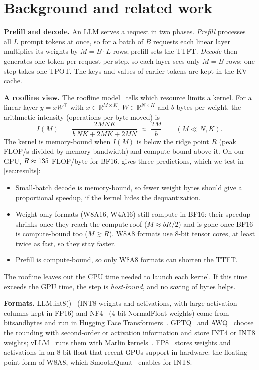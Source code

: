 \section{Background and related work}
\label{sec:background}

\textbf{Prefill and decode.} An LLM serves a request in two phases. \emph{Prefill} processes all $L$
prompt tokens at once, so for a batch of $B$ requests each linear layer multiplies its weights by
$M=B\cdot L$ rows; prefill sets the TTFT. \emph{Decode} then generates one token per request per step,
so each layer sees only $M=B$ rows; one step takes one TPOT. The keys and values of earlier tokens
are kept in the KV cache.

\textbf{A roofline view.} The roofline model~\cite{williams2009roofline} tells which resource limits a
kernel. For a linear layer $y=xW^\top$ with $x\in\mathbb{R}^{M\times K}$, $W\in\mathbb{R}^{N\times K}$
and $b$ bytes per weight, the arithmetic intensity (operations per byte moved) is
\begin{equation}
  I(M) \;=\; \frac{2MNK}{b\,NK + 2MK + 2MN} \;\approx\; \frac{2M}{b} \qquad (M \ll N, K).
  \label{eq:intensity}
\end{equation}
The kernel is memory-bound when $I(M)$ is below the ridge point $R$ (peak FLOP/s divided by memory
bandwidth) and compute-bound above it. On our GPU, $R\approx135$ FLOP/byte for BF16.
 gives three predictions, which we test in \cref{sec:results}:
\begin{itemize}
\item[\textbf{P1}] Small-batch decode is memory-bound, so fewer weight bytes should give a
  proportional speedup, if the kernel hides the dequantization.
\item[\textbf{P2}] Weight-only formats (W8A16, W4A16) still compute in BF16: their speedup shrinks
  once they reach the compute roof ($M\approx bR/2$) and is gone once BF16 is compute-bound too
  ($M\gtrsim R$). W8A8 formats use 8-bit tensor cores, at least twice as fast, so they stay faster.
\item[\textbf{P3}] Prefill is compute-bound, so only W8A8 formats can shorten the TTFT.
\end{itemize}
The roofline leaves out the CPU time needed to launch each kernel. If this time exceeds the GPU time,
the step is \emph{host-bound}, and no saving of bytes helps.

\textbf{Formats.} LLM.int8()~\cite{dettmers2022llmint8} (INT8 weights and activations, with large
activation columns kept in FP16) and NF4~\cite{dettmers2023qlora} (4-bit NormalFloat weights) come
from bitsandbytes and run in Hugging Face Transformers~\cite{hfbnb}. GPTQ~\cite{frantar2023gptq} and
AWQ~\cite{lin2024awq} choose the rounding with second-order or activation information and store INT4
or INT8 weights; vLLM~\cite{kwon2023vllm} runs them with Marlin kernels~\cite{frantar2025marlin}.
FP8~\cite{micikevicius2022fp8} stores weights and activations in an 8-bit float that recent GPUs
support in hardware: the floating-point form of W8A8, which SmoothQuant~\cite{xiao2023smoothquant}
enables for INT8.

